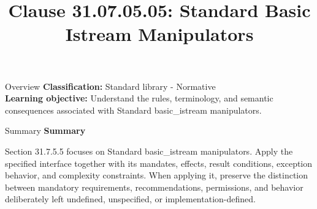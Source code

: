 \documentclass[10pt,letterpaper]{article}
\title{Clause 31.07.05.05: Standard Basic Istream Manipulators}
\author{}
\date{}
\begin{document}
\maketitle
\begin{CornellOverviewBox}{Overview}
\textbf{Classification:} Standard library - Normative\\[2pt]
\textbf{Learning objective:} Understand the rules, terminology, and semantic consequences associated with Standard basic\_istream manipulators.
\end{CornellOverviewBox}\begin{CornellSummaryBox}{Summary}
{\sffamily\bfseries\color{Accent} Summary}\par\vspace{3pt}Section 31.7.5.5 focuses on Standard basic\_istream manipulators. Apply the specified interface together with its mandates, effects, result conditions, exception behavior, and complexity constraints. When applying it, preserve the distinction between mandatory requirements, recommendations, permissions, and behavior deliberately left undefined, unspecified, or implementation-defined.
\end{CornellSummaryBox}
\end{document}
